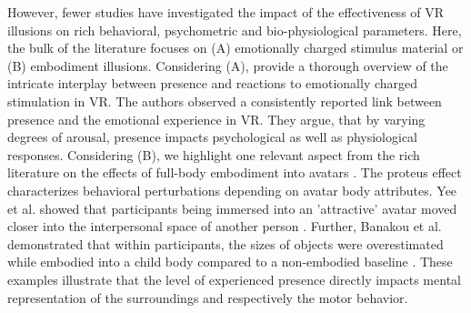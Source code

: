 However, fewer studies have investigated the impact of the effectiveness of VR illusions on rich behavioral, psychometric and bio-physiological parameters. Here, the bulk of the literature focuses on (A) emotionally charged stimulus material or (B) embodiment illusions. Considering (A), \citet{Diemer2015} provide a thorough overview of the intricate interplay between presence and reactions to emotionally charged stimulation in VR. The authors observed a consistently reported link between presence and the emotional experience in VR. They argue, that by varying degrees of arousal, presence impacts psychological as well as physiological responses. Considering (B), we highlight one relevant aspect from the rich literature on the effects of full-body embodiment into avatars \citep{Maister2015}. The proteus effect characterizes behavioral perturbations depending on avatar body attributes. Yee et al. showed that participants being immersed into an 'attractive' avatar moved closer into the interpersonal space of another person \citep{Yee2007}. Further, Banakou et al. demonstrated that within participants, the sizes of objects were overestimated while embodied into a child body compared to a non-embodied baseline \citep{Banakou2013}. These examples illustrate that the level of experienced presence directly impacts mental representation of the surroundings and respectively the motor behavior.